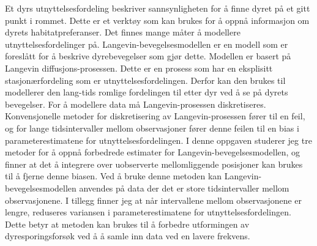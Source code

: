 Et dyrs utnyttelsesfordeling beskriver sannsynligheten for å finne dyret på et gitt punkt i rommet. Dette er et verktøy som kan brukes for å oppnå informasjon om dyrets habitatpreferanser. Det finnes mange måter å modellere utnyttelsesfordelinger på. Langevin-bevegelsesmodellen er en modell som er foreslått for å beskrive dyrebevegelser som gjør dette. Modellen er basert på Langevin diffusjons-prosessen. Dette er en prosess som har en eksplisitt stasjonærfordeling som er utnyttelsesfordelingen. Derfor kan den brukes til modellerer den lang-tids romlige fordelingen til etter dyr ved å se på dyrets bevegelser. For å modellere data må Langevin-prosessen diskretiseres. Konvensjonelle metoder for diskretisering av Langevin-prosessen fører til en feil, og for lange tidsintervaller mellom observasjoner fører denne feilen til en bias i parameterestimatene for utnyttelsesfordelingen. I denne oppgaven studerer jeg tre metoder for å oppnå forbedrede estimater for Langevin-bevegelsesmodellen, og finner at det å integrere over uobserverte mellomliggende posisjoner kan brukes til å fjerne denne biasen. Ved å bruke denne metoden kan Langevin-bevegelsesmodellen anvendes på data der det er store tidsintervaller mellom observasjonene. I tillegg finner jeg at når intervallene mellom observasjonene er lengre, reduseres variansen i parameterestimatene for utnyttelsesfordelingen. Dette betyr at metoden kan brukes til å forbedre utformingen av dyresporingsforsøk ved å å samle inn data ved en lavere frekvens.











\newpage
\null
\thispagestyle{empty}
\newpage